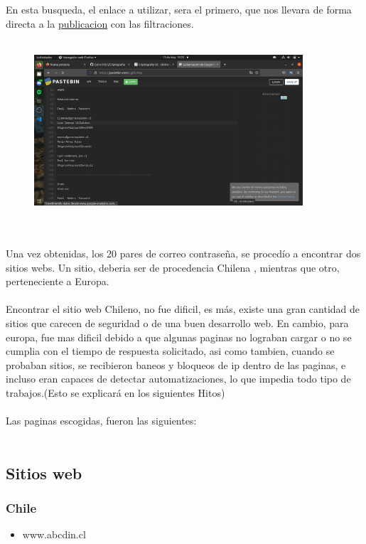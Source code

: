\documentclass[]{article}
\begin{document}
    \\\\
    En esta busqueda, el enlace a utilizar, sera el primero, que nos llevara de forma directa a la
    \href{https://pastebin.com/LgbbJRsp}{publicacion}  con las filtraciones.
    \\\\
    \begin{figure}[h!]
        \centering
        \includegraphics[width=10cm]{leakspastebin.png}
    \end{figure}


    \\\\
    Una vez obtenidas, los 20 pares de correo contraseña, se procedío a encontrar dos sitios webs. Un sitio, deberia ser de procedencia Chilena
    , mientras que otro, perteneciente a Europa. 
    \\\\
    Encontrar el sitio web Chileno, no fue dificil, es más, existe una gran cantidad de sitios que carecen de seguridad o de una buen
    desarrollo web. En cambio, para europa, fue mas dificil debido a que algunas paginas no lograban cargar o no se cumplia con el tiempo de
    respuesta solicitado, asi como tambien, cuando se probaban sitios, se recibieron baneos y bloqueos de ip dentro de las paginas, e incluso
    eran capaces de detectar automatizaciones, lo que impedia todo tipo de trabajos.(Esto se explicará en los siguientes Hitos)
    \\\\
    Las paginas escogidas, fueron las siguientes: 
    \\\\
    \subsection{Sitios web}
        \subsubsection{Chile}
        \begin{itemize}
            \item www.abcdin.cl
        \end{itemize}
\end{document}
